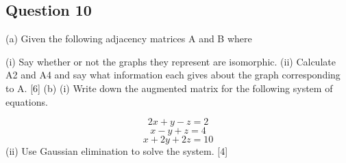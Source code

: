 \documentclass[]{report}
\begin{document}
\subsection*{Question 10}

(a) Given the following adjacency matrices A and B where
%
%
%



(i) Say whether or not the graphs they represent are isomorphic.
(ii) Calculate A2 and A4 and say what information each gives about the graph
corresponding to A. [6]
(b) (i) Write down the augmented matrix for the following system of equations.

\[2x + y - z = 2\]
\[x - y + z = 4\]
\[x + 2y + 2z = 10\]
(ii) Use Gaussian elimination to solve the system. [4]
\end{document}
